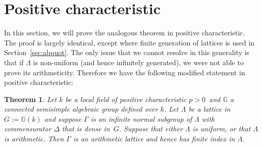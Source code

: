 \documentclass[JEP,XML,SOM,Unicode,published]{cedram}
\newcommand{\bbG}{\ensuremath{\mathbb{G}}}
\newtheorem{thm}{Theorem}[section]
\theoremstyle{definition}
\begin{document}
\section{Positive characteristic}
\label{sec:char+}

In this section, we will prove the analogous theorem in positive characteristic. The proof is largely identical, except where finite generation of lattices is used in Section~\ref{sec:abquot}. The only issue that we cannot resolve in this generality is that if $\Lambda$ is non-uniform (and hence infinitely generated), we were not able to prove its arithmeticity. Therefore we have the following modified statement in positive characteristic:

\begin{thm}\label{thm:char+}
Let $k$ be a local field of positive characteristic $p>0$\, and $\bbG$ a connected semisimple algebraic group defined over $k$. Let $\Lambda$ be a lattice in $G:=\bbG(k)$ and suppose $\Gamma$ is an infinite normal subgroup of $\Lambda$ with commensurator $\Delta$ that is dense in~$G$. Suppose that either $\Lambda$ is uniform, or that $\Lambda$ is arithmetic. Then $\Gamma$ is an arithmetic lattice and hence has finite index in $\Lambda$.
\end{thm}
\end{document}
